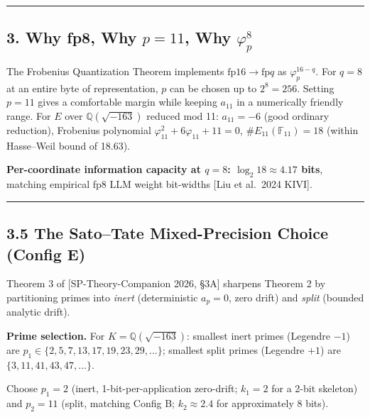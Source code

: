 \documentclass[
  11pt,
]{article}
\begin{document}
\begin{center}\rule{0.5\linewidth}{0.5pt}\end{center}

\hypertarget{why-fp8-why-p-11-why-varphi_p8}{%
\subsection{\texorpdfstring{3. Why fp8, Why \(p = 11\), Why
\(\varphi_p^8\)}{3. Why fp8, Why p = 11, Why \textbackslash varphi\_p\^{}8}}\label{why-fp8-why-p-11-why-varphi_p8}}

The Frobenius Quantization Theorem implements
\(\mathrm{fp}16 \to \mathrm{fp}q\) as \(\varphi_p^{16-q}\). For
\(q = 8\) at an entire byte of representation, \(p\) can be chosen up to
\(2^8 = 256\). Setting \(p = 11\) gives a comfortable margin while
keeping \(a_{11}\) in a numerically friendly range. For \(E\) over
\(\mathbb{Q}(\sqrt{-163})\) reduced mod 11: \(a_{11} = -6\) (good
ordinary reduction), Frobenius polynomial
\(\varphi_{11}^2 + 6\varphi_{11} + 11 = 0\),
\(\#E_{11}(\mathbb{F}_{11}) = 18\) (within Hasse--Weil bound of 18.63).

\textbf{Per-coordinate information capacity at \(q = 8\):
\(\log_2 18 \approx 4.17\) bits}, matching empirical fp8 LLM weight
bit-widths {[}Liu et al.~2024 KIVI{]}.

\begin{center}\rule{0.5\linewidth}{0.5pt}\end{center}

\hypertarget{the-satotate-mixed-precision-choice-config-e}{%
\subsection{3.5 The Sato--Tate Mixed-Precision Choice (Config
E)}\label{the-satotate-mixed-precision-choice-config-e}}

Theorem 3 of {[}SP-Theory-Companion 2026, §3A{]} sharpens Theorem 2 by
partitioning primes into \emph{inert} (deterministic \(a_p = 0\), zero
drift) and \emph{split} (bounded analytic drift).

\textbf{Prime selection.} For \(K = \mathbb{Q}(\sqrt{-163})\): smallest
inert primes (Legendre \(-1\)) are
\(p_1 \in \{2, 5, 7, 13, 17, 19, 23, 29, \dots\}\); smallest split
primes (Legendre \(+1\)) are \(\{3, 11, 41, 43, 47, \dots\}\).

Choose \(p_1 = 2\) (inert, 1-bit-per-application zero-drift; \(k_1 = 2\)
for a 2-bit skeleton) and \(p_2 = 11\) (split, matching Config B;
\(k_2 \approx 2.4\) for approximately 8 bits).
\end{document}
